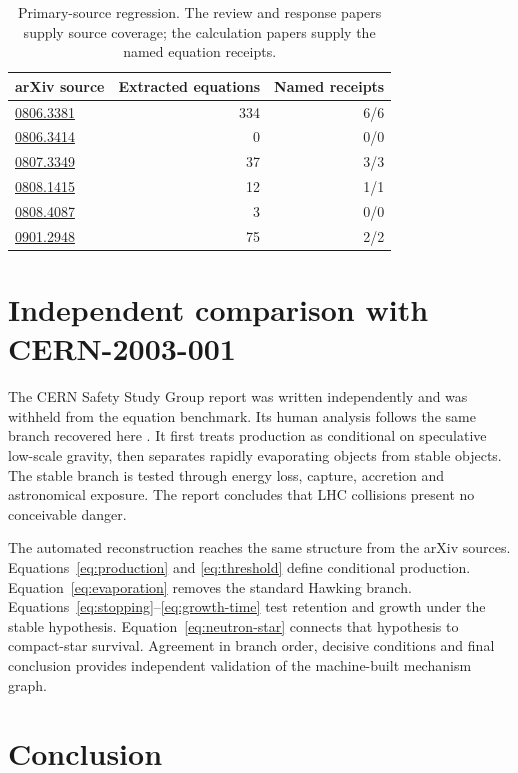 \documentclass[10pt]{article}
\begin{document}
\begin{table}[t]
\centering
\caption{Primary-source regression. The review and response papers supply source coverage; the calculation papers supply the named equation receipts.}
\label{tab:gold}
\begin{tabular}{lrr}
\toprule
arXiv source & Extracted equations & Named receipts \\
\midrule
\href{https://arxiv.org/abs/0806.3381}{0806.3381} & 334 & 6/6 \\
\href{https://arxiv.org/abs/0806.3414}{0806.3414} & 0 & 0/0 \\
\href{https://arxiv.org/abs/0807.3349}{0807.3349} & 37 & 3/3 \\
\href{https://arxiv.org/abs/0808.1415}{0808.1415} & 12 & 1/1 \\
\href{https://arxiv.org/abs/0808.4087}{0808.4087} & 3 & 0/0 \\
\href{https://arxiv.org/abs/0901.2948}{0901.2948} & 75 & 2/2 \\
\bottomrule
\end{tabular}
\end{table}

\section{Independent comparison with CERN-2003-001}

The CERN Safety Study Group report was written independently and was withheld from the equation benchmark. Its human analysis follows the same branch recovered here \cite{CERN2003}. It first treats production as conditional on speculative low-scale gravity, then separates rapidly evaporating objects from stable objects. The stable branch is tested through energy loss, capture, accretion and astronomical exposure. The report concludes that LHC collisions present no conceivable danger.

The automated reconstruction reaches the same structure from the arXiv sources. Equations~\eqref{eq:production} and \eqref{eq:threshold} define conditional production. Equation~\eqref{eq:evaporation} removes the standard Hawking branch. Equations~\eqref{eq:stopping}--\eqref{eq:growth-time} test retention and growth under the stable hypothesis. Equation~\eqref{eq:neutron-star} connects that hypothesis to compact-star survival. Agreement in branch order, decisive conditions and final conclusion provides independent validation of the machine-built mechanism graph.

\section{Conclusion}
\end{document}
